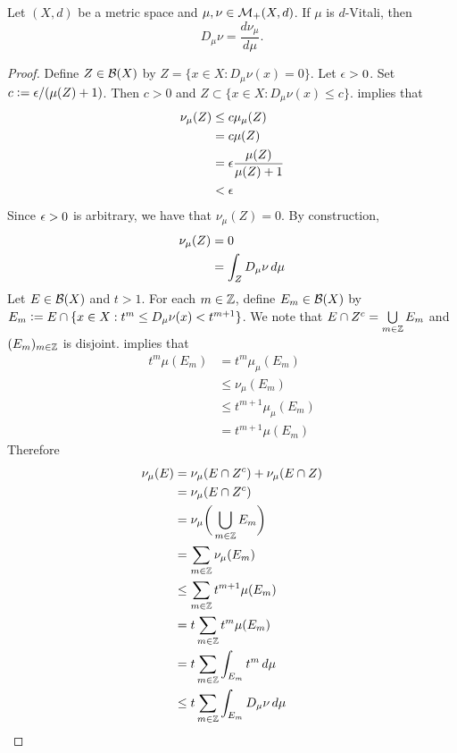 \documentclass{book}
\begin{document}
	\begin{ex} 
		Let $(X, d)$ be a metric space and $\mu, \nu \in \mathcal{M}_+(X, d)$. If $\mu$ is $d$-Vitali, then 
		$$D_{\mu} \nu = \frac{d\nu_{\mu}}{d\mu}.$$
	\end{ex}
	
	\begin{proof}
		Define $Z \in \mathcal{B}(X)$ by $Z = \{x \in X: D_{\mu}\nu(x) = 0\}$. Let $\epsilon > 0$. Set $c \vcentcolon= \epsilon/(\mu(Z) + 1)$. Then $c > 0$ and $Z \subset \{x \in X: D_{\mu}\nu(x) \leq c \}$.  implies that
		\begin{align*}
			\nu_{\mu}(Z) 
			& \leq c \mu_{\mu}(Z) \\
			& = c \mu(Z) \\
			& = \epsilon \frac{\mu(Z)}{\mu(Z) + 1} \\
			& < \epsilon 
		\end{align*} 
		Since $\epsilon > 0$ is arbitrary, we have that $\nu_{\mu}(Z) = 0$. By construction, 
		\begin{align*}
			\nu_{\mu}(Z) 
			& = 0 \\
			& = \int_{Z} D_{\mu}\nu \, d \mu 
		\end{align*} 
		Let $E \in \mathcal{B}(X)$ and $t > 1$. For each $m \in \mathbb{Z}$, define $E_m \in \mathcal{B}(X)$ by $E_m \vcentcolon= E \cap \{x \in X: t^m \leq D_{\mu}\nu(x) < t^{m+1}\}$. We note that $E \cap Z^c = \bigcup\limits_{m \in \mathbb{Z}} E_m$ and $(E_m)_{m \in \mathbb{Z}}$ is disjoint.  implies that 
		\begin{align*}
			t^m \mu(E_m)
			& = t^m\mu_{\mu}(E_m) \\
			& \leq \nu_{\mu}(E_m) \\
			& \leq t^{m+1}\mu_{\mu}(E_m) \\
			& = t^{m+1} \mu(E_m)
		\end{align*}
		Therefore
		\begin{align*}
			\nu_{\mu}(E)
			& = \nu_{\mu}(E \cap Z^c) + \nu_{\mu}(E \cap Z) \\
			& = \nu_{\mu}(E \cap Z^c) \\
			& = \nu_{\mu} \bigg( \bigcup_{m \in \Z} E_m \bigg) \\
			& = \sum_{m \in \Z} \nu_{\mu}(E_m) \\
			& \leq \sum_{m \in \Z} t^{m+1} \mu(E_m) \\
			& = t\sum_{m \in \Z} t^m \mu(E_m) \\
			& = t\sum_{m \in \Z} \int_{E_m} t^m \dmu \\
			& \leq t \sum_{m \in \Z} \int_{E_m} D_{\mu} \nu \dmu \\

\end{align*}
\end{proof}
\end{document}
